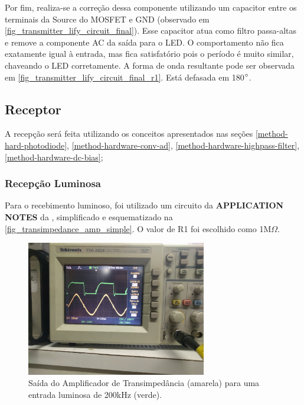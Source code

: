 		Por fim, realiza-se a correção dessa componente utilizando um capacitor entre os terminais da Source do MOSFET e GND (observado em \autoref{fig_transmitter_lify_circuit_final}). Esse capacitor atua como filtro passa-altas e remove a componente AC da saída para o LED. O comportamento não fica exatamente igual à entrada, mas fica satisfatório pois o período é muito similar, chaveando o LED corretamente. A forma de onda resultante pode ser observada em \autoref{fig_transmitter_lify_circuit_final_r1}. Está defasada em 180$\degree$.
	
		\subsection{Receptor}
		
		A recepção será feita utilizando os conceitos apresentados nas seções \ref{method-hard-photodiode}, \ref{method-hardware-conv-ad}, \ref{method-hardware-highpass-filter}, \ref{method-hardware-dc-bias};
		
		\subsubsection{Recepção Luminosa}
		
		Para o recebimento luminoso, foi utilizado um circuito da \textbf{APPLICATION NOTES} da , simplificado e esquematizado na \autoref{fig_transimpedance_amp_simple}. O valor de R1 foi escolhido como 1M$\Omega$.
		
		\begin{figure}[htb]
			\caption{\label{fig_receiver_lify_circuit_fail0_r1} Saída do Amplificador de Transimpedância (amarela) para uma entrada luminosa de 200kHz (verde).}
			\centering		%
			\includegraphics[width=0.7\textwidth, trim={5cm 30cm 90cm 20cm}, clip]{circuits/photos/RX_TIA_result.jpg}
		\end{figure}
		
